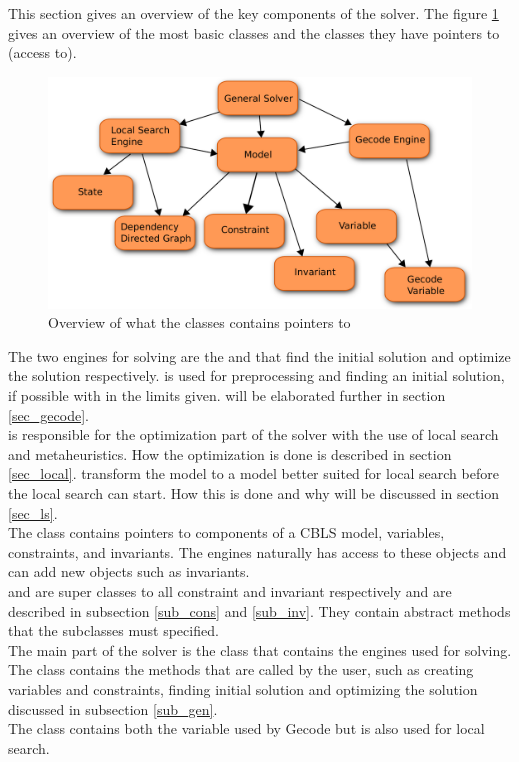 This section gives an overview of the key components of the solver. The figure \ref{fig_architec} gives an overview 
of the most basic classes and the classes they have pointers to (access to). \\
\begin{figure}[!b]
\includegraphics[width=\linewidth]{architectureTest}\caption{Overview of what the classes contains pointers to} 
\label{fig_architec}
\end{figure}
The two engines for solving are the \gecodesol and \lssol that find the initial solution and optimize the solution 
respectively. \gecodesol is used for preprocessing and finding an initial solution, if possible with in the limits 
given. 
\gecodesol will be elaborated further in section \ref{sec_gecode}. \\
\lssol is responsible for the optimization part of the solver with the use of local search and 
metaheuristics. How the optimization is done is described in section \ref{sec_local}. \lssol 
transform the model to a model better suited for local search before the local search can start. How this is done and 
why will be discussed in section \ref{sec_ls}. \\ 
The  class contains pointers to components of a CBLS model, variables, constraints, and invariants. The 
engines naturally has access to these objects and \lssol can add new objects such as invariants. \\ 
 and  are super classes to all constraint and invariant respectively and are 
described in subsection \ref{sub_cons} and \ref{sub_inv}. They contain abstract methods that the subclasses must 
specified. \\ 
The main part of the solver is the  class that contains the engines used for solving.
The  class contains the methods that are called by the user, such as creating variables and 
constraints, finding initial solution and optimizing the solution discussed in subsection \ref{sub_gen}. \\ 
The  class contains both the variable used by Gecode but is also used for local search. 
